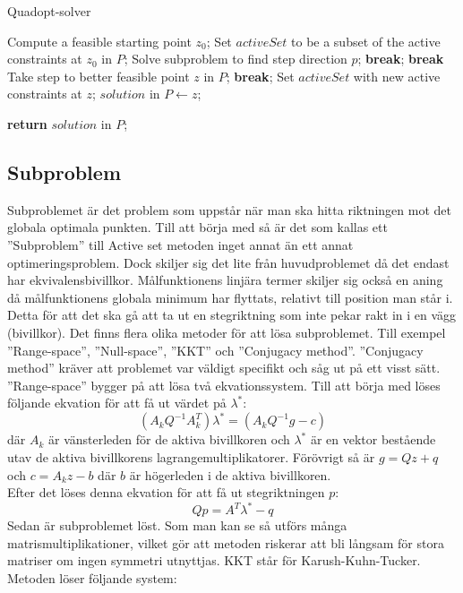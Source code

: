 \begin{algorithm}[H]
\caption{Quadopt-solver}
\label{alg:quadoptsolver}
\begin{algorithmic}
	\State Compute a feasible starting point $z_0$;
\EndIf	
\State Set $activeSet$ to be a subset of the active constraints at $z_0$ in $P$;
	\State Solve subproblem to find step direction $p$;
			\State \textbf{break};
		\EndIf		
			\State \textbf{break}
		\EndIf
	\Else
		\State Take step to better feasible point $z$ in $P$;
			\State \textbf{break};
		\EndIf
		\State Set $activeSet$ with new active constraints at $z$;	
	\EndIf
\EndWhile
\State  $solution$ in $P\gets z$;

\State \textbf{return} $solution$ in $P$;
	
\EndProcedure
\end{algorithmic}
\end{algorithm}

\subsection{Subproblem}
Subproblemet är det problem som uppstår när man ska hitta riktningen mot det globala optimala punkten. Till att börja med så är det som kallas ett ''Subproblem'' till Active set metoden inget annat än ett annat optimeringsproblem. Dock skiljer sig det lite från huvudproblemet då det endast har ekvivalensbivillkor. Målfunktionens linjära termer skiljer sig också en aning då målfunktionens globala minimum har flyttats, relativt till position man står i. Detta för att det ska gå att ta ut en stegriktning som inte pekar rakt in i en vägg (bivillkor). 
\newline
\newline
Det finns flera olika metoder för att lösa subproblemet.
Till exempel ''Range-space'', ''Null-space'', ''KKT'' och ''Conjugacy method''. ''Conjugacy method'' kräver att problemet var väldigt specifikt och såg ut på ett visst sätt. ''Range-space'' bygger på att lösa två ekvationssystem. Till att börja med löses följande ekvation för att få ut värdet på $\lambda^*$:
$$({A_k}Q^{-1}A_k^T)\lambda^* = ({A_k}Q^{-1}g-c)$$
där $A_k$ är vänsterleden för de aktiva bivillkoren och $\lambda^*$ är en vektor bestående utav de aktiva bivillkorens lagrangemultiplikatorer. Förövrigt så är
$g = Qz+q$ och $c = A_kz - b$ där $b$ är högerleden i de aktiva bivillkoren. \\ Efter det löses denna ekvation för att få ut stegriktningen $p$:
$$Qp = A^T\lambda^* - q$$
Sedan är subproblemet löst. Som man kan se så utförs många matrismultiplikationer, vilket gör att metoden riskerar att bli långsam för stora matriser om ingen symmetri utnyttjas. 
\newline
\newline
KKT står för Karush-Kuhn-Tucker. Metoden löser följande system:

